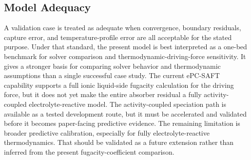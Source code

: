     \subsection{Model Adequacy}
        A validation case is treated as adequate when convergence, boundary residuals, capture error, and temperature-profile error are all acceptable for the stated purpose. Under that standard, the present model is best interpreted as a one-bed benchmark for solver comparison and thermodynamic-driving-force sensitivity. It gives a stronger basis for comparing solver behavior and thermodynamic assumptions than a single successful case study. The current ePC-SAFT capability supports a full ionic liquid-side fugacity calculation for the driving force, but it does not yet make the entire absorber residual a fully activity-coupled electrolyte-reactive model. The activity-coupled speciation path is available as a tested development route, but it must be accelerated and validated before it becomes paper-facing predictive evidence. The remaining limitation is broader predictive calibration, especially for fully electrolyte-reactive thermodynamics. That should be validated as a future extension rather than inferred from the present fugacity-coefficient comparison.
